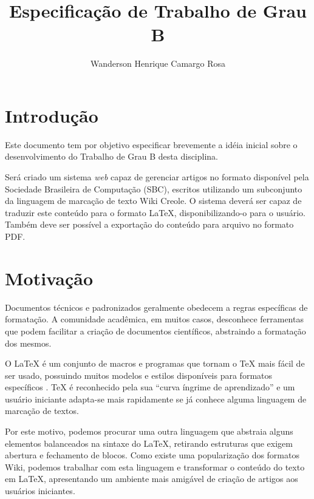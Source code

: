 \documentclass{article}
\title{Especificação de Trabalho de Grau B}
\author{Wanderson Henrique Camargo Rosa\inst{1}}
\begin{document}
\maketitle{}

\section{Introdução}
\label{sec:introducao}

Este documento tem por objetivo especificar brevemente a idéia inicial sobre o
desenvolvimento do Trabalho de Grau B desta disciplina.

Será criado um sistema \textit{web} capaz de gerenciar artigos no formato
disponível pela Sociedade Brasileira de Computação (SBC), escritos utilizando um
subconjunto da linguagem de marcação de texto Wiki Creole. O sistema deverá ser
capaz de traduzir este conteúdo para o formato \LaTeX{}, disponibilizando-o para
o usuário. Também deve ser possível a exportação do conteúdo para arquivo no
formato PDF.

\section{Motivação}
\label{sec:motivacao}

Documentos técnicos e padronizados geralmente obedecem a regras específicas de
formatação. A comunidade acadêmica, em muitos casos, desconhece ferramentas que
podem facilitar a criação de documentos científicos, abstraindo a formatação dos
mesmos.

O \LaTeX{} é um conjunto de macros e programas que tornam o \TeX{} mais fácil de
ser usado, possuindo muitos modelos e estilos disponíveis para formatos
específicos \cite{p241-salzberg}. \TeX{} é reconhecido pela sua ``curva íngrime
de aprendizado'' e um usuário iniciante adapta-se mais rapidamente se já conhece
alguma linguagem de marcação de textos.

Por este motivo, podemos procurar uma outra linguagem que abstraia alguns
elementos balanceados na sintaxe do \LaTeX{}, retirando estruturas que exigem
abertura e fechamento de blocos. Como existe uma popularização dos formatos
Wiki, podemos trabalhar com esta linguagem e transformar o conteúdo do texto em
\LaTeX{}, apresentando um ambiente mais amigável de criação de artigos aos
usuários iniciantes.
\end{document}
